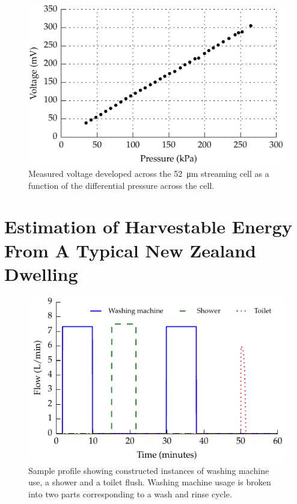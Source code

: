 \documentclass[10pt,final,journal]{IEEEtran}
\begin{document}
    \begin{figure}
        \begin{center}
        \includegraphics[width=\linewidth]{graph_voltagePressure}
        \end{center}
        \caption{Measured voltage developed across the \SI{52}{\micro\meter} streaming cell as a function of the differential pressure across the cell.}
        \label{fig:cellVoltagePressure}
    \end{figure}


    \section{Estimation of Harvestable Energy From A Typical New Zealand Dwelling}
    \label{sect:waterConsumption}
    \begin{figure}
        \begin{center}
        \includegraphics[width=\linewidth]{graph_profile}
        \end{center}
        \caption{Sample profile showing constructed instances of washing machine use, a shower and a toilet flush.
        Washing machine usage is broken into two parts corresponding to a wash and rinse cycle.}
        \label{fig:profileSample}
    \end{figure}
\end{document}

